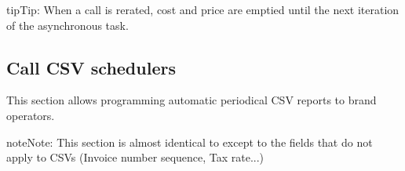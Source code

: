 \documentclass[letterpaper,10pt,english]{sphinxmanual}
\begin{document}
\begin{notice}{tip}{Tip:}
When a call is rerated, cost and price are emptied until the next iteration of the asynchronous task.
\end{notice}


\subsection{Call CSV schedulers}
\label{administration_portal/brand/calls/call_csv_schedulers:call-csv-schedulers}\label{administration_portal/brand/calls/call_csv_schedulers::doc}\label{administration_portal/brand/calls/call_csv_schedulers:id1}
This section allows programming automatic periodical CSV reports to brand operators.

\begin{notice}{note}{Note:}
This section is almost identical to {\hyperref[administration_portal/brand/invoicing/invoice_schedulers:invoice\string-schedulers]{}} except to the
fields that do not apply to CSVs (Invoice number sequence, Tax rate...)
\end{notice}
\end{document}
